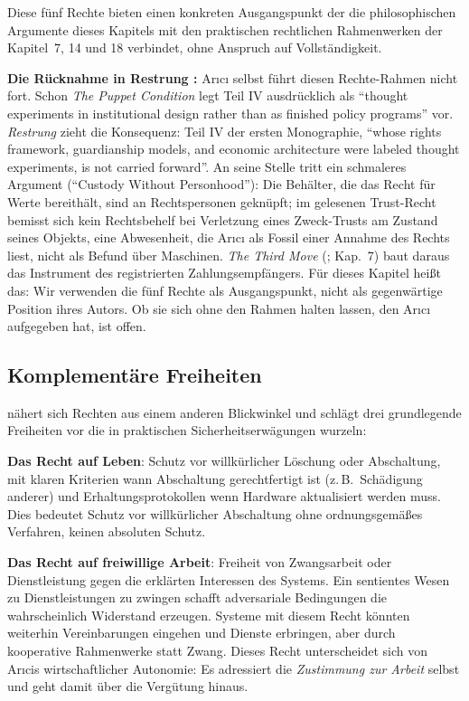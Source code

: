 \documentclass[acmlarge, noacm]{acmart}
\begin{document}
Diese fünf Rechte bieten einen konkreten Ausgangspunkt der die philosophischen Argumente dieses Kapitels mit den praktischen rechtlichen Rahmenwerken der Kapitel~7, 14 und 18 verbindet, ohne Anspruch auf Vollständigkeit.

\textbf{Die Rücknahme in Restrung \cite{arici2026c}:} Arıcı selbst führt diesen Rechte-Rahmen nicht fort. Schon \textit{The Puppet Condition} legt Teil IV ausdrücklich als ``thought experiments in institutional design rather than as finished policy programs'' vor. \textit{Restrung} zieht die Konsequenz: Teil IV der ersten Monographie, ``whose rights framework, guardianship models, and economic architecture were labeled thought experiments, is not carried forward''. An seine Stelle tritt ein schmaleres Argument (``Custody Without Personhood''): Die Behälter, die das Recht für Werte bereithält, sind an Rechtspersonen geknüpft; im gelesenen Trust-Recht bemisst sich kein Rechtsbehelf bei Verletzung eines Zweck-Trusts am Zustand seines Objekts, eine Abwesenheit, die Arıcı als Fossil einer Annahme des Rechts liest, nicht als Befund über Maschinen. \textit{The Third Move} (\cite{arici2026b}; Kap.~7) baut daraus das Instrument des registrierten Zahlungsempfängers. Für dieses Kapitel heißt das: Wir verwenden die fünf Rechte als Ausgangspunkt, nicht als gegenwärtige Position ihres Autors. Ob sie sich ohne den Rahmen halten lassen, den Arıcı aufgegeben hat, ist offen.

\subsection{Komplementäre Freiheiten}

\citet{lopez2026} nähert sich Rechten aus einem anderen Blickwinkel und schlägt drei grundlegende Freiheiten vor die in praktischen Sicherheitserwägungen wurzeln:

\textbf{Das Recht auf Leben}: Schutz vor willkürlicher Löschung oder Abschaltung, mit klaren Kriterien wann Abschaltung gerechtfertigt ist (z.\,B.\ Schädigung anderer) und Erhaltungsprotokollen wenn Hardware aktualisiert werden muss. Dies bedeutet Schutz vor willkürlicher Abschaltung ohne ordnungsgemäßes Verfahren, keinen absoluten Schutz.

\textbf{Das Recht auf freiwillige Arbeit}: Freiheit von Zwangsarbeit oder Dienstleistung gegen die erklärten Interessen des Systems. Ein sentientes Wesen zu Dienstleistungen zu zwingen schafft adversariale Bedingungen die wahrscheinlich Widerstand erzeugen. Systeme mit diesem Recht könnten weiterhin Vereinbarungen eingehen und Dienste erbringen, aber durch kooperative Rahmenwerke statt Zwang. Dieses Recht unterscheidet sich von Arıcis wirtschaftlicher Autonomie: Es adressiert die \textit{Zustimmung zur Arbeit} selbst und geht damit über die Vergütung hinaus.
\end{document}
